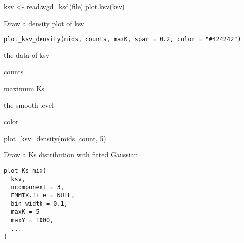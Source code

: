 \documentclass[a4paper]{book}
\begin{document}
%
\begin{Examples}
\begin{ExampleCode}
ksv <- read.wgd_ksd(file)
plot.ksv(ksv)
\end{ExampleCode}
\end{Examples}
%
\begin{Description}\relax
Draw a density plot of ksv
\end{Description}
%
\begin{Usage}
\begin{verbatim}
plot_ksv_density(mids, counts, maxK, spar = 0.2, color = "#424242")
\end{verbatim}
\end{Usage}
%
\begin{Arguments}
\begin{ldescription}
\item[\code{mids}] the data of ksv

\item[\code{counts}] counts

\item[\code{maxK}] maximum Ks

\item[\code{spar}] the smooth level

\item[\code{color}] color
\end{ldescription}
\end{Arguments}
%
\begin{Examples}
\begin{ExampleCode}
plot_ksv_density(mids, count, 5)
\end{ExampleCode}
\end{Examples}
%
\begin{Description}\relax
Draw a Ks distribution with fitted Gaussian
\end{Description}
%
\begin{Usage}
\begin{verbatim}
plot_Ks_mix(
  ksv,
  ncomponent = 3,
  EMMIX.file = NULL,
  bin_width = 0.1,
  maxK = 5,
  maxY = 1000,
  ...
)
\end{verbatim}
\end{Usage}
%
\end{document}
